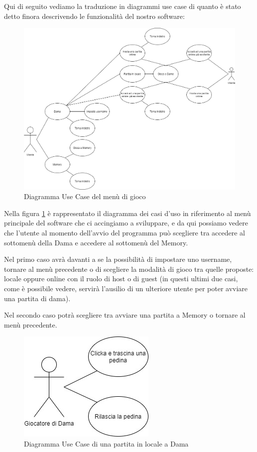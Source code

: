 \documentclass[12pt]{article}
\begin{document}
Qui di seguito vediamo la traduzione in diagrammi use case di quanto è stato detto finora descrivendo le funzionalità del nostro software:

\begin{figure}[H]
\centering
\includegraphics[scale=.35]{UseCaseMain}
\caption{Diagramma Use Case del menù di gioco}
\label{img:usecasemain}
\end{figure}

Nella figura \ref{img:usecasemain} è rappresentato il diagramma dei casi d'uso in riferimento al menù principale del software che ci accingiamo a sviluppare, e da qui possiamo vedere che l'utente al momento dell'avvio del programma può scegliere tra accedere al sottomenù della Dama e accedere al sottomenù del Memory.

Nel primo caso avrà davanti a se la possibilità di impostare uno username, tornare al menù precedente o di scegliere la modalità di gioco tra quelle proposte: locale oppure online con il ruolo di host o di guest (in questi ultimi due casi, come è possibile vedere, servirà l'ausilio di un ulteriore utente per poter avviare una partita di dama).

Nel secondo caso potrà scegliere tra avviare una partita a Memory o tornare al menù precedente.

\begin{figure}[H]
\centering
\includegraphics[scale=.5]{UseCaseCheckers}
\caption{Diagramma Use Case di una partita in locale a Dama}
\label{img:usecasecheckers}
\end{figure}
\end{document}
